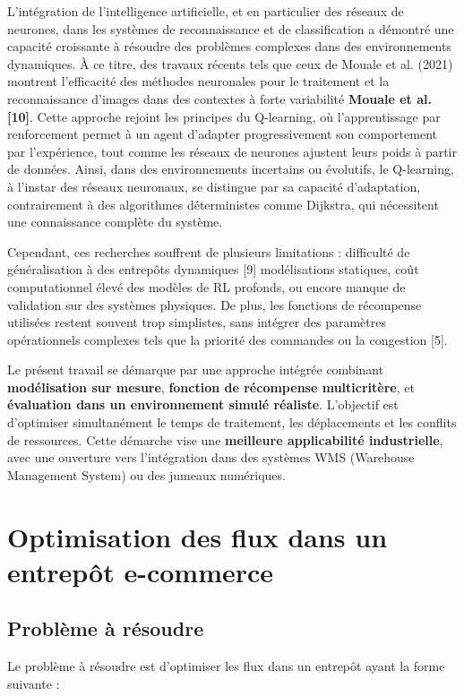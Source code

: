 \documentclass{article}
\begin{document}
L’intégration de l’intelligence artificielle, et en particulier des réseaux de neurones, dans les systèmes de reconnaissance et de classification a démontré une capacité croissante à résoudre des problèmes complexes dans des environnements dynamiques. À ce titre, des travaux récents tels que ceux de Mouale et al. (2021) montrent l'efficacité des méthodes neuronales pour le traitement et la reconnaissance d’images dans des contextes à forte variabilité \textbf{Mouale et al. [10]}. Cette approche rejoint les principes du Q-learning, où l'apprentissage par renforcement permet à un agent d'adapter progressivement son comportement par l’expérience, tout comme les réseaux de neurones ajustent leurs poids à partir de données. Ainsi, dans des environnements incertains ou évolutifs, le Q-learning, à l’instar des réseaux neuronaux, se distingue par sa capacité d’adaptation, contrairement à des algorithmes déterministes comme Dijkstra, qui nécessitent une connaissance complète du système.

Cependant, ces recherches souffrent de plusieurs limitations : difficulté de généralisation à des entrepôts dynamiques [9] modélisations statiques, coût computationnel élevé des modèles de RL profonds, ou encore manque de validation sur des systèmes physiques. De plus, les fonctions de récompense utilisées restent souvent trop simplistes, sans intégrer des paramètres opérationnels complexes tels que la priorité des commandes ou la congestion [5].

Le présent travail se démarque par une approche intégrée combinant \textbf{modélisation sur mesure}, \textbf{fonction de récompense multicritère}, et \textbf{évaluation dans un environnement simulé réaliste}. L'objectif est d'optimiser simultanément le temps de traitement, les déplacements et les conflits de ressources. Cette démarche vise une \textbf{meilleure applicabilité industrielle}, avec une ouverture vers l'intégration dans des systèmes WMS (Warehouse Management System) ou des jumeaux numériques.

\section{Optimisation des flux dans un entrepôt e-commerce}
\subsection{Problème à résoudre}
Le problème à résoudre est d'optimiser les flux dans un entrepôt ayant la forme suivante :
\end{document}
